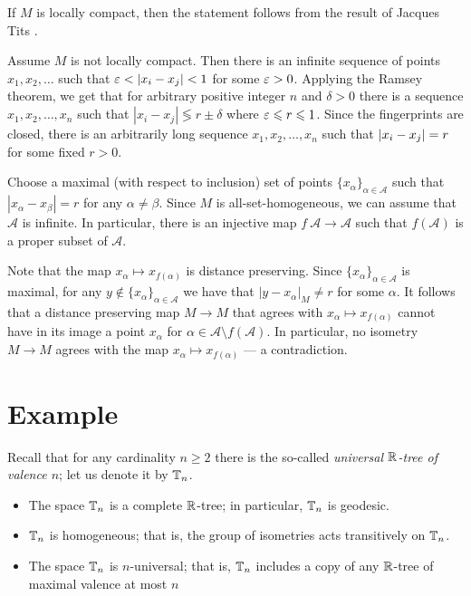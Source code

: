 \documentclass[a4paper,10pt]{article}
\begin{document}
If $M$ is locally compact, then the statement follows from the result of Jacques Tits \cite{tits}.

Assume $M$ is not locally compact.
Then there is an infinite sequence of points $x_1,x_2,\dots$ such that 
$\eps<|x_i-x_j|<1$ for some $\varepsilon>0$.
Applying the Ramsey theorem, we get that for arbitrary positive integer $n$ and $\delta>0$ there is a sequence $x_1,x_2,\dots,x_n$ such that 
$|x_i-x_j|\lessgtr r\pm \delta$ where $\varepsilon \leqslant r\leqslant 1$.
Since the fingerprints are closed, there is an arbitrarily long sequence 
$x_1,x_2,\dots,x_n$ such that 
$|x_i\z-x_j|= r$ for some fixed $r>0$.

Choose a maximal (with respect to inclusion) set of points $\{x_\alpha\}_{\alpha\in \mathcal{A}}$ such that $|x_\alpha-x_\beta|=r$ for any $\alpha\ne \beta$.
Since $M$ is all-set-homogeneous, we can assume that $\mathcal{A}$ is infinite.
In particular, there is an injective map $f\:\mathcal{A}\to\mathcal{A}$ such that $f(\mathcal{A})$ is a proper subset of $\mathcal{A}$.

Note that the map $x_\alpha\mapsto x_{f(\alpha)}$ is distance preserving.
Since $\{x_\alpha\}_{\alpha\in \mathcal{A}}$ is maximal, for any $y\notin \{x_\alpha\}_{\alpha\in \mathcal{A}}$ we have that $|y-x_\alpha|_M\ne r$ for some $\alpha$.
It follows that a distance preserving map $M\to M$ that agrees with $x_\alpha\mapsto x_{f(\alpha)}$ cannot have in its image a point $x_\alpha$ for $\alpha\in \mathcal{A}\setminus f(\mathcal{A})$.
In particular, no isometry $M\to M$ agrees with the map $x_\alpha\mapsto x_{f(\alpha)}$ --- a contradiction.
\qeds

\section{Example}

Recall that for any cardinality $n\ge 2$ there is the so-called \emph{universal $\mathbb{R}$-tree of valence $n$}; let us denote it by $\mathbb{T}_n$.
\begin{itemize}
\item The space $\mathbb{T}_n$ is a complete $\mathbb{R}$-tree; in particular, $\mathbb{T}_n$ is geodesic.
\item $\mathbb{T}_n$ is homogeneous; that is, the group of isometries acts transitively on $\mathbb{T}_n$.
\item The space $\mathbb{T}_n$ is $n$-universal; that is, $\mathbb{T}_n$ includes a copy of any $\mathbb{R}$-tree of maximal valence at most $n$
\end{itemize}
\end{document}
